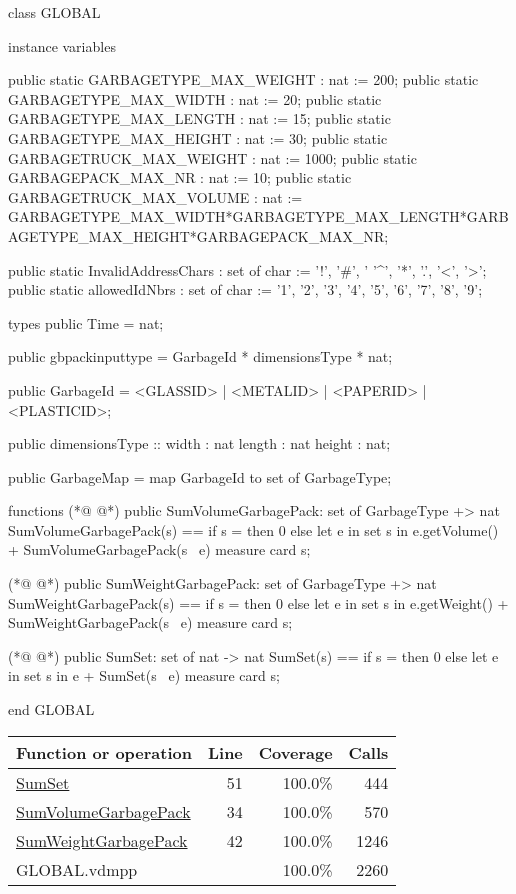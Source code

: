 \begin{vdmpp}[breaklines=true]
class GLOBAL

instance variables

public static GARBAGETYPE_MAX_WEIGHT    : nat := 200;
public static GARBAGETYPE_MAX_WIDTH     : nat := 20;
public static GARBAGETYPE_MAX_LENGTH    : nat := 15;
public static GARBAGETYPE_MAX_HEIGHT    : nat := 30;
public static GARBAGETRUCK_MAX_WEIGHT   : nat := 1000;
public static GARBAGEPACK_MAX_NR        : nat := 10;
public static GARBAGETRUCK_MAX_VOLUME   : nat := GARBAGETYPE_MAX_WIDTH*GARBAGETYPE_MAX_LENGTH*GARBAGETYPE_MAX_HEIGHT*GARBAGEPACK_MAX_NR;


public static InvalidAddressChars : set of char := {'!', '#', '%
                                            '^', '*', '.', '<', '>'};
public static allowedIdNbrs : set of char := {'1', '2', '3', '4', '5', '6', '7', '8', '9'};


types 
    public Time = nat;

    public gbpackinputtype = GarbageId * dimensionsType * nat;

    public GarbageId = <GLASSID> | <METALID> | <PAPERID> | <PLASTICID>;

    public dimensionsType :: width  : nat
                            length : nat
                            height : nat;

    public GarbageMap = map GarbageId to set of GarbageType;

    
functions
(*@
\label{SumVolumeGarbagePack:34}
@*)
public SumVolumeGarbagePack: set of GarbageType +> nat
SumVolumeGarbagePack(s) ==
    if s = {}                         
    then 0                                         
    else let e in set s in
        e.getVolume() + SumVolumeGarbagePack(s \ {e})
measure card s;

(*@
\label{SumWeightGarbagePack:42}
@*)
public SumWeightGarbagePack: set of GarbageType +> nat
SumWeightGarbagePack(s) ==
    if s = {}                         
    then 0                                         
    else let e in set s in
        e.getWeight() + SumWeightGarbagePack(s \ {e})
measure card s;


(*@
\label{SumSet:51}
@*)
public SumSet: set of nat -> nat
SumSet(s) ==
    if s = {}
    then 0
    else let e in set s in
        e + SumSet(s \ {e})
measure card s;


end GLOBAL
\end{vdmpp}
\bigskip
\begin{longtable}{|l|r|r|r|}
\hline
Function or operation & Line & Coverage & Calls \\
\hline
\hline
\hyperref[SumSet:51]{SumSet} & 51&100.0\% & 444 \\
\hline
\hyperref[SumVolumeGarbagePack:34]{SumVolumeGarbagePack} & 34&100.0\% & 570 \\
\hline
\hyperref[SumWeightGarbagePack:42]{SumWeightGarbagePack} & 42&100.0\% & 1246 \\
\hline
\hline
GLOBAL.vdmpp & & 100.0\% & 2260 \\
\hline
\end{longtable}

